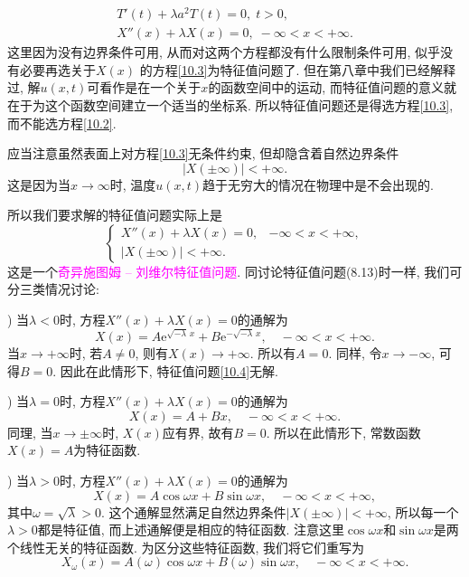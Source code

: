\documentclass[aspectratio=169,notheorems,12pt,compress,UTF8]{ctexbeamer} %
\newcommand{\me}{\mathrm{e}}
\newcommand{\raw}{\rightarrow}
\newcommand{\spb}{\vspace{3mm}}
\begin{document}
\begin{frame}
\vspace{-5mm}
\begin{gather}
T'(t)+\lambda a^2T(t)=0,\;t>0,\label{10.2}\\
X''(x)+\lambda X(x)=0,\;-\infty<x<+\infty.\label{10.3}
\end{gather}\pause
这里因为没有边界条件可用, 从而对这两个方程都没有什么限制条件可用,
似乎没有必要再选关于$X(x)$ 的方程\eqref{10.3}为特征值问题了. \pause
但在第八章中我们已经解释过, {\heiti 解$u(x,t)$可看作是在一个关于$x$的函数空间中的运动,
而特征值问题的意义就在于为这个函数空间建立一个适当的坐标系}.
所以特征值问题还是得选方程\eqref{10.3}, 而不能选方程\eqref{10.2}.\pause\spb

\qquad 应当注意虽然表面上对方程\eqref{10.3}无条件约束, 但却隐含着自然边界条件
$$
|X(\pm \infty)|<+\infty.
$$\pause
这是因为当$x\rightarrow\infty$时, 温度$u(x,t)$趋于无穷大的情况在物理中是不会出现的.
\end{frame}

\begin{frame}
所以我们要求解的特征值问题实际上是
\begin{equation}\label{10.4}
\left\{
\begin{array}{ll}
X''(x)+\lambda X(x)=0,&-\infty<x<+\infty,\\
|X(\pm \infty)|<+\infty.
\end{array}\right.
\end{equation}\pause
这是一个\textcolor{magenta}{奇异施图姆 -- 刘维尔特征值问题}. \pause 同讨论特征值问题(8.13)时一样, 我们可分三类情况讨论:\pause\spb

) 当$\lambda<0$时, 方程$X''(x)+\lambda X(x)=0$的通解为
$$
X(x)=A\me^{\sqrt{-\lambda}\,x}+B\me^{-\sqrt{-\lambda}\,x},\quad -\infty<x<+\infty.
$$
当$x\rightarrow+\infty$时, 若$A\neq0$, 则有$X(x)\rightarrow+\infty$.
所以有$A=0$. 同样, 令$x\rightarrow-\infty$, 可得$B=0$. 因此在此情形下, 特征值问题\eqref{10.4}无解.

\end{frame}

\begin{frame}
) 当$\lambda=0$时, 方程$X''(x)+\lambda X(x)=0$的通解为
\begin{equation*}
 X(x)= A+Bx,\quad -\infty<x<+\infty.
\end{equation*}
同理, 当$x\raw\pm\infty$时, $X(x)$应有界, 故有$B=0$. 所以在此情形下, 常数函数$X(x)=A$为特征函数.\pause\spb

) 当$\lambda>0$时, 方程$X''(x)+\lambda X(x)=0$的通解为
\begin{equation*}
X(x)=A\cos\omega x+B\sin\omega x,\quad-\infty<x<+\infty,
\end{equation*}
其中$\omega=\sqrt{\lambda}>0$. 这个通解显然满足自然边界条件$|X(\pm \infty)|<+\infty$,
所以每一个$\lambda>0$都是特征值, 而上述通解便是相应的特征函数. 注意这里$\cos\omega x$和$\sin\omega x$是两个线性无关的特征函数. \pause
为区分这些特征函数, 我们将它们重写为
\begin{equation*}
X_{\omega}(x)=A(\omega)\cos\omega x+B(\omega)\sin\omega x,\quad
-\infty<x<+\infty.
\end{equation*}

\end{frame}
\end{document}
